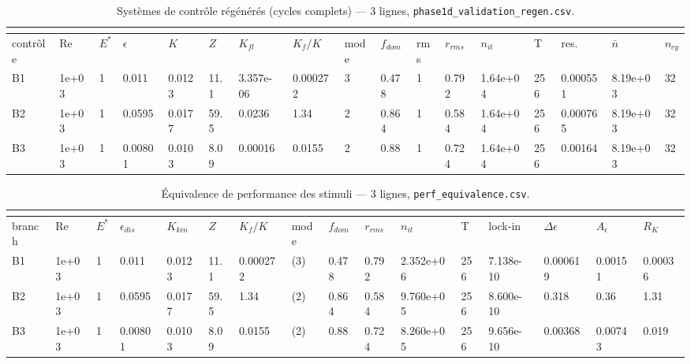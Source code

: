 \documentclass[11pt,a4paper]{article}
\begin{document}
\begin{landscape}
\begingroup\tiny
    \setlength{\tabcolsep}{1.2pt}
    \begin{longtable}{*{17}{l}}
    \caption{Systèmes de contrôle régénérés (cycles complets) --- 3 lignes, \texttt{phase1d\_validation\_regen.csv}.}\\
    \label{tab:v1r}\\
    \toprule
    contrôle & Re & $E^*$ & $\epsilon$ & $K$ & $Z$ & $K_{fl}$ & $K_f/K$ & mode & $f_{dom}$ & rms & $r_{rms}$ & $n_{it}$ & T & res. & $\bar{n}$ & $n_{cy}$ \\
    \midrule
    \endhead
    \bottomrule
    \endlastfoot
    B1 & 1e+03 & 1 & 0.011 & 0.0123 & 11.1 & 3.357e-06 & 0.000272 & 3 & 0.478 & 1 & 0.792 & 1.64e+04 & 256 & 0.000551 & 8.19e+03 & 32 \\
    B2 & 1e+03 & 1 & 0.0595 & 0.0177 & 59.5 & 0.0236 & 1.34 & 2 & 0.864 & 1 & 0.584 & 1.64e+04 & 256 & 0.000765 & 8.19e+03 & 32 \\
    B3 & 1e+03 & 1 & 0.00801 & 0.0103 & 8.09 & 0.00016 & 0.0155 & 2 & 0.88 & 1 & 0.724 & 1.64e+04 & 256 & 0.00164 & 8.19e+03 & 32 \\
    \end{longtable}
\endgroup
\end{landscape}


\begin{landscape}
\begingroup\tiny
    \setlength{\tabcolsep}{1.2pt}
    \begin{longtable}{*{16}{l}}
    \caption{Équivalence de performance des stimuli --- 3 lignes, \texttt{perf\_equivalence.csv}.}\\
    \label{tab:v2}\\
    \toprule
    branch & Re & $E^*$ & $\epsilon_{dis}$ & $K_{kin}$ & $Z$ & $K_f/K$ & mode & $f_{dom}$ & $r_{rms}$ & $n_{it}$ & T & lock-in & $\Delta\epsilon$ & $A_\epsilon$ & $R_K$ \\
    \midrule
    \endhead
    \bottomrule
    \endlastfoot
    B1 & 1e+03 & 1 & 0.011 & 0.0123 & 11.1 & 0.000272 & (3) & 0.478 & 0.792 & 2.352e+06 & 256 & 7.138e-10 & 0.000619 & 0.00151 & 0.00036 \\
    B2 & 1e+03 & 1 & 0.0595 & 0.0177 & 59.5 & 1.34 & (2) & 0.864 & 0.584 & 9.760e+05 & 256 & 8.600e-10 & 0.318 & 0.36 & 1.31 \\
    B3 & 1e+03 & 1 & 0.00801 & 0.0103 & 8.09 & 0.0155 & (2) & 0.88 & 0.724 & 8.260e+05 & 256 & 9.656e-10 & 0.00368 & 0.00743 & 0.019 \\
    \end{longtable}
\endgroup
\end{landscape}
\end{document}
